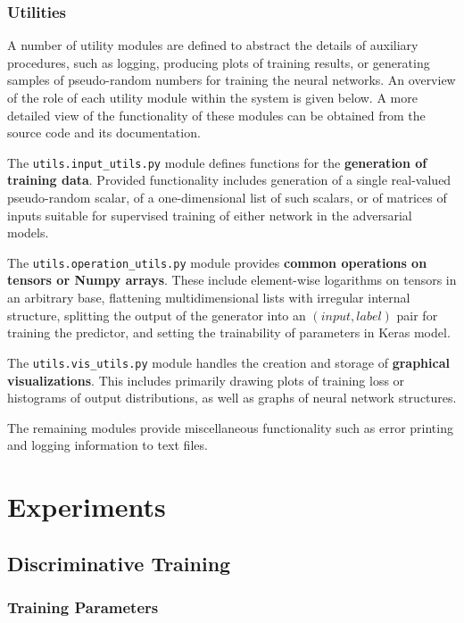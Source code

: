 \documentclass[12pt, titlepage]{report}
\theoremstyle{definition}
\begin{document}
\subsection{Utilities}
A number of utility modules are defined to abstract the details of auxiliary procedures, such as logging, producing plots of training results, or generating samples of pseudo-random numbers for training the neural networks. An overview of the role of each utility module within the system is given below. A more detailed view of the functionality of these modules can be obtained from the source code and its documentation.

The \texttt{utils.input_utils.py} module defines functions for the \textbf{generation of training data}. Provided functionality includes generation of a single real-valued pseudo-random scalar, of a one-dimensional list of such scalars, or of matrices of inputs suitable for supervised training of either network in the adversarial models.

The \texttt{utils.operation_utils.py} module provides \textbf{common operations on tensors or Numpy arrays}. These include element-wise logarithms on tensors in an arbitrary base, flattening multidimensional lists with irregular internal structure, splitting the output of the generator into an $(input, label)$ pair for training the predictor, and setting the trainability of parameters in Keras model.

The \texttt{utils.vis_utils.py} module handles the creation and storage of \textbf{graphical visualizations}. This includes primarily drawing plots of training loss or histograms of output distributions, as well as graphs of neural network structures.

The remaining modules provide miscellaneous functionality such as error printing and logging information to text files.


\chapter{Experiments}\label{chapter:experiments}
\section{Discriminative Training}
\subsection{Training Parameters}
\end{document}
